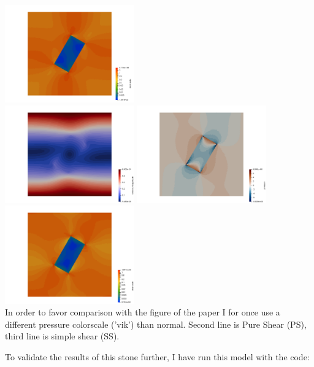 \begin{center}
\includegraphics[width=5.57cm]{python_codes/fieldstone_142/results/case1/sr1}\\
\includegraphics[width=5.57cm]{python_codes/fieldstone_142/results/case1/vel2}
\includegraphics[width=5.57cm]{python_codes/fieldstone_142/results/case1/press2}
\includegraphics[width=5.57cm]{python_codes/fieldstone_142/results/case1/sr2}\\
{\captionfont In order to favor comparison with the figure of the paper I for once
use a different pressure colorscale ('vik') than normal. 
Second line is Pure Shear (PS), third line is simple shear (SS).}
\end{center}

To validate the results of this stone further, I have run this model with the \aspect
code:

